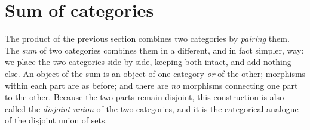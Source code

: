
\section{Sum of categories}
\label{sec:sum-of-categories}


The product of the previous section combines two categories by \emph{pairing} them.
The \emph{sum} of two categories combines them in a different, and in fact simpler, way: we place the two categories side by side, keeping both intact, and add nothing else.
An object of the sum is an object of one category \emph{or} of the other; morphisms within each part are as before; and there are \emph{no} morphisms connecting one part to the other.
Because the two parts remain disjoint, this construction is also called the \emph{disjoint union} of the two categories, and it is the categorical analogue of the disjoint union of sets.

